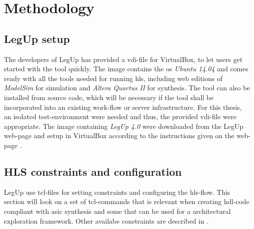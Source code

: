 \chapter{Methodology}
\label{chp:methodology} 

\section{LegUp setup}
The developers of LegUp has provided a \gls{vdi}-file for VirtualBox, to let users get started with the tool quickly. The image contains the \gls{os} \textit{Ubuntu 14.04} and comes ready with all the tools needed for running \gls{hls}, including web editions of \textit{ModelSim} for simulation and \textit{Altera Quartus II} for synthesis. The tool can also be installed from source code, which will be necessary if the tool shall be incorporated into an existing work-flow or server infrastructure.
For this thesis, an isolated test-environment were needed and thus, the provided \gls{vdi}-file were appropriate. The image containing \textit{LegUp 4.0} were downloaded from the LegUp web-page and setup in VirtualBox according to the instructions given on the web-page \cite{legupgetstarted}. 

\section{HLS constraints and configuration}
LegUp use \gls{tcl}-files for setting constraints and configuring the \gls{hls}-flow. This section will look on a set of \gls{tcl}-commands that is relevant when creating \gls{hdl}-code compliant with \gls{asic} synthesis and some that can be used for a architectural exploration framework. Other availabe constraints are described in \cite{legupconst}.
